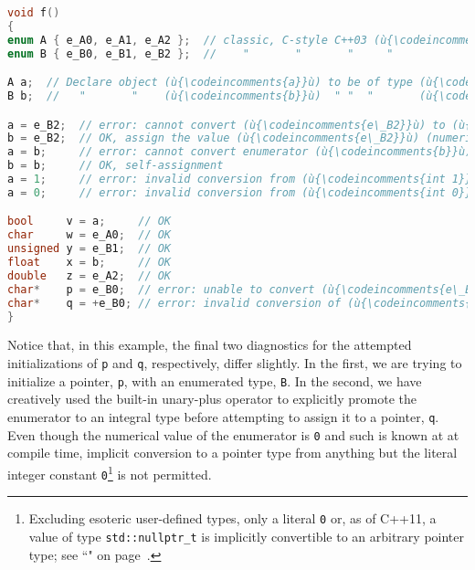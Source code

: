 \begin{lstlisting}[language=C++]
void f()
{
enum A { e_A0, e_A1, e_A2 };  // classic, C-style C++03 (ù{\codeincomments{enum}}ù)
enum B { e_B0, e_B1, e_B2 };  //    "       "       "     "

A a;  // Declare object (ù{\codeincomments{a}}ù) to be of type (ù{\codeincomments{A}}ù).
B b;  //   "       "    (ù{\codeincomments{b}}ù)  " "  "       (ù{\codeincomments{B}}ù).

a = e_B2;  // error: cannot convert (ù{\codeincomments{e\_B2}}ù) to (ù{\codeincomments{enum}}ù) type (ù{\codeincomments{A}}ù)
b = e_B2;  // OK, assign the value (ù{\codeincomments{e\_B2}}ù) (numerically 2) to (ù{\codeincomments{b}}ù).
a = b;     // error: cannot convert enumerator (ù{\codeincomments{b}}ù) to (ù{\codeincomments{enum}}ù) type (ù{\codeincomments{A}}ù)
b = b;     // OK, self-assignment
a = 1;     // error: invalid conversion from (ù{\codeincomments{int 1}}ù) to (ù{\codeincomments{enum}}ù) type (ù{\codeincomments{A}}ù)
a = 0;     // error: invalid conversion from (ù{\codeincomments{int 0}}ù) to (ù{\codeincomments{enum}}ù) type (ù{\codeincomments{A}}ù)

bool     v = a;     // OK
char     w = e_A0;  // OK
unsigned y = e_B1;  // OK
float    x = b;     // OK
double   z = e_A2;  // OK
char*    p = e_B0;  // error: unable to convert (ù{\codeincomments{e\_B0}}ù) to (ù{\codeincomments{char*}}ù)
char*    q = +e_B0; // error: invalid conversion of (ù{\codeincomments{int}}ù) to (ù{\codeincomments{char*}}ù)
}
\end{lstlisting}

\noindent Notice that, in this example, the final two diagnostics for the
attempted initializations of \texttt{p} and \texttt{q}, respectively,
differ slightly. In the first, we are trying to initialize a pointer,
\texttt{p}, with an enumerated type, \texttt{B}. In the second, we have
creatively used the built-in unary-plus operator to explicitly promote
the enumerator to an integral type before attempting to assign it to a
pointer, \texttt{q}. Even though the numerical value of the enumerator
is \texttt{0} and such is known at at compile time, implicit
conversion to a pointer type from anything but the literal integer
constant \texttt{0}{\cprotect\footnote{Excluding esoteric user-defined
types, only a literal \texttt{0} or, as of C++11, a value of type
\texttt{std::nullptr\_t} is implicitly convertible to an arbitrary
pointer type; see ``" on page~\pageref{null-pointer-literal-(nullptr)}.}} is not
permitted.

